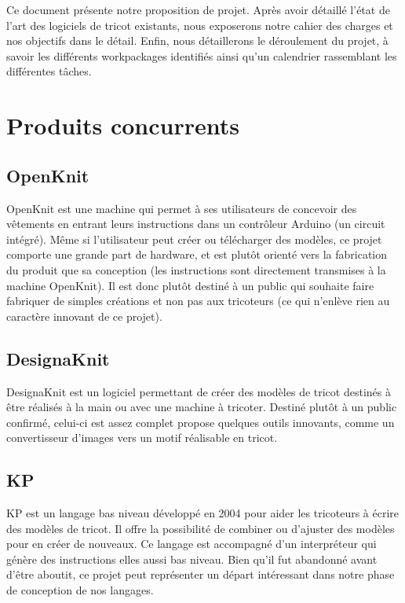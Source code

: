 \documentclass{article}
\begin{document}
Ce document présente notre proposition de projet. Après avoir détaillé l'état de l'art des logiciels de tricot existants, nous exposerons
notre cahier des charges et nos objectifs dans le détail. Enfin, nous détaillerons le déroulement du projet, à savoir les différents
workpackages identifiés ainsi qu'un calendrier rassemblant les différentes tâches.


\section{Produits concurrents}



\subsection{OpenKnit}

OpenKnit est une machine qui permet à ses utilisateurs de concevoir des vêtements en entrant leurs instructions dans un contrôleur Arduino
(un circuit intégré). Même si l'utilisateur peut créer ou télécharger des modèles, ce projet comporte une grande part de hardware, et est
plutôt orienté vers la fabrication du produit que sa conception (les instructions sont directement transmises à la machine OpenKnit). Il
est donc plutôt destiné à un public qui souhaite faire fabriquer de simples créations et non pas aux tricoteurs (ce qui n'enlève rien au
caractère innovant de ce projet).

\subsection{DesignaKnit}

DesignaKnit est un logiciel permettant de créer des modèles de tricot destinés à être réalisés à la main ou avec une machine à tricoter.
Destiné plutôt à un public confirmé, celui-ci est assez complet propose quelques outils innovants, comme un convertisseur d'images vers un
motif réalisable en tricot.

\subsection{KP}

KP est un langage bas niveau développé en 2004 pour aider les tricoteurs à écrire des modèles de tricot. Il offre la possibilité de
combiner ou d'ajuster des modèles pour en créer de nouveaux. Ce langage est accompagné d'un interpréteur qui génère des instructions elles
aussi bas niveau. Bien qu'il fut abandonné avant d'être aboutit, ce projet peut représenter un départ intéressant dans notre phase de conception de
nos langages.
\end{document}
